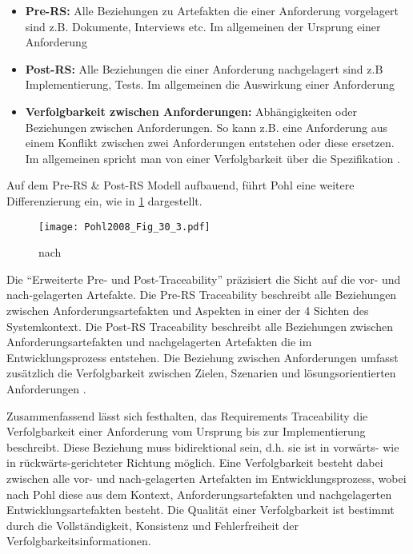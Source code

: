\begin{itemize}
    \item \textbf{Pre-RS:} Alle Beziehungen zu Artefakten die einer Anforderung vorgelagert sind z.B. Dokumente, Interviews etc. Im allgemeinen der Ursprung einer Anforderung
    \item \textbf{Post-RS:} Alle Beziehungen die einer Anforderung nachgelagert sind z.B Implementierung, Tests. Im allgemeinen die Auswirkung einer Anforderung
    \item \textbf{Verfolgbarkeit zwischen Anforderungen:} Abhängigkeiten oder Beziehungen zwischen Anforderungen. So kann z.B. eine Anforderung aus einem Konflikt zwischen zwei Anforderungen entstehen oder diese ersetzen. Im allgemeinen spricht man von einer Verfolgbarkeit über die Spezifikation \cite{Pohl2015BasiswissenIREB-Standard}.
\end{itemize}

Auf dem Pre-RS \& Post-RS Modell aufbauend, führt Pohl eine weitere Differenzierung ein, wie in \ref{fig:abb2} dargestellt.

\begin{figure}[!htb]
  \centering
  \texttt{[image: Pohl2008\_Fig\_30\_3.pdf]}
  \caption{nach \cite[Fig. 30.3]{Pohl2008RequirementsTechniken}}
  \label{fig:abb2}
\end{figure}

Die \enquote{Erweiterte Pre- und Post-Traceability} präzisiert die Sicht auf die vor- und nach-gelagerten Artefakte. Die Pre-RS Traceability beschreibt alle Beziehungen zwischen Anforderungsartefakten und Aspekten in einer der 4 Sichten des Systemkontext. Die Post-RS Traceability beschreibt alle Beziehungen zwischen Anforderungsartefakten und nachgelagerten Artefakten die im Entwicklungsprozess entstehen. Die Beziehung zwischen Anforderungen umfasst zusätzlich die Verfolgbarkeit zwischen Zielen, Szenarien und lösungsorientierten Anforderungen \cite{Pohl2008RequirementsTechniken}.

Zusammenfassend lässt sich festhalten, das Requirements Traceability die Verfolgbarkeit einer Anforderung vom Ursprung bis zur Implementierung beschreibt. Diese Beziehung muss bidirektional sein, d.h. sie ist in vorwärts- wie in rückwärts-gerichteter Richtung möglich. Eine Verfolgbarkeit besteht dabei zwischen alle vor- und nach-gelagerten Artefakten im Entwicklungsprozess, wobei nach Pohl diese aus dem Kontext, Anforderungsartefakten und nachgelagerten Entwicklungsartefakten besteht. Die Qualität einer Verfolgbarkeit ist bestimmt durch die Vollständigkeit, Konsistenz und Fehlerfreiheit der Verfolgbarkeitsinformationen.

